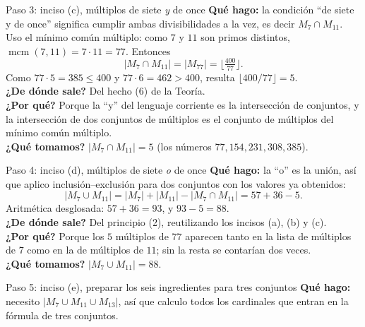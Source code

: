 \documentclass[11pt]{article}
\begin{document}
\begin{sol}
\begin{paso}{Paso 3: inciso (c), m\'ultiplos de siete \emph{y} de once}
\textbf{Qu\'e hago:} la condici\'on ``de siete y de once'' significa cumplir ambas divisibilidades a la vez, es decir $M_7\cap M_{11}$. Uso el m\'inimo com\'un m\'ultiplo: como $7$ y $11$ son primos distintos, $\operatorname{mcm}(7,11)=7\cdot 11=77$. Entonces
\[
|M_7\cap M_{11}| = |M_{77}| = \Big\lfloor \tfrac{400}{77}\Big\rfloor .
\]
Como $77\cdot 5 = 385 \le 400$ y $77\cdot 6 = 462 > 400$, resulta $\big\lfloor 400/77 \big\rfloor = 5$.\\
\textbf{¿De d\'onde sale?} Del hecho (6) de la Teor\'ia.\\
\textbf{¿Por qu\'e?} Porque la ``y'' del lenguaje corriente es la intersecci\'on de conjuntos, y la intersecci\'on de dos conjuntos de m\'ultiplos es el conjunto de m\'ultiplos del m\'inimo com\'un m\'ultiplo.\\
\textbf{¿Qu\'e tomamos?} $|M_7\cap M_{11}| = 5$ (los n\'umeros $77,154,231,308,385$).
\end{paso}

\begin{paso}{Paso 4: inciso (d), m\'ultiplos de siete \emph{o} de once}
\textbf{Qu\'e hago:} la ``o'' es la uni\'on, as\'i que aplico inclusi\'on--exclusi\'on para dos conjuntos con los valores ya obtenidos:
\[
|M_7\cup M_{11}| = |M_7| + |M_{11}| - |M_7\cap M_{11}| = 57 + 36 - 5.
\]
Aritm\'etica desglosada: $57+36 = 93$, y $93 - 5 = 88$.\\
\textbf{¿De d\'onde sale?} Del principio (2), reutilizando los incisos (a), (b) y (c).\\
\textbf{¿Por qu\'e?} Porque los $5$ m\'ultiplos de $77$ aparecen tanto en la lista de m\'ultiplos de $7$ como en la de m\'ultiplos de $11$; sin la resta se contar\'ian dos veces.\\
\textbf{¿Qu\'e tomamos?} $|M_7\cup M_{11}| = 88$.
\end{paso}

\begin{paso}{Paso 5: inciso (e), preparar los seis ingredientes para tres conjuntos}
\textbf{Qu\'e hago:} necesito $|M_7\cup M_{11}\cup M_{13}|$, as\'i que calculo todos los cardinales que entran en la f\'ormula de tres conjuntos.


\end{paso}
\end{sol}
\end{document}
